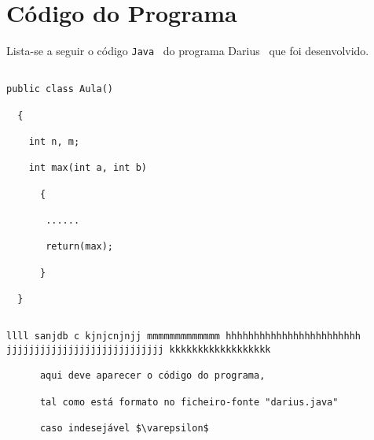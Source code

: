 \documentclass[pdftex,12pt,a4paper]{report}
\def\darius{\textsf{Darius}\xspace}
\def\java{\texttt{Java}\xspace}
\def\pe{\emph{Publicação Eletrónica}\xspace}
\begin{document}

\begin{abstract}
Isto é um resumo do relatório de \pe focando o contexto do trb (muito
sucinto),os objetivos concretos e os resultados atingidos.

Algum texto curto mas que entusiasme a leitura do relatório de \pe.

\end{abstract}

\tableofcontents











\appendix

\chapter{Código do Programa}



Lista-se a seguir o código \java~\cite{citeulike:4677363} do programa
\darius~\cite{FCH11a} que foi desenvolvido.

\begin{verbatim}

public class Aula()

  {

    int n, m;

    int max(int a, int b)

      {

       ......

       return(max);

      }

  }

\end{verbatim}



\begin{verbatim}

llll sanjdb c kjnjcnjnjj mmmmmmmmmmmmm hhhhhhhhhhhhhhhhhhhhhhhh
jjjjjjjjjjjjjjjjjjjjjjjjjjjj kkkkkkkkkkkkkkkkkk

      aqui deve aparecer o código do programa,

      tal como está formato no ficheiro-fonte "darius.java"

      caso indesejável $\varepsilon$

\end{verbatim}
\end{document}
